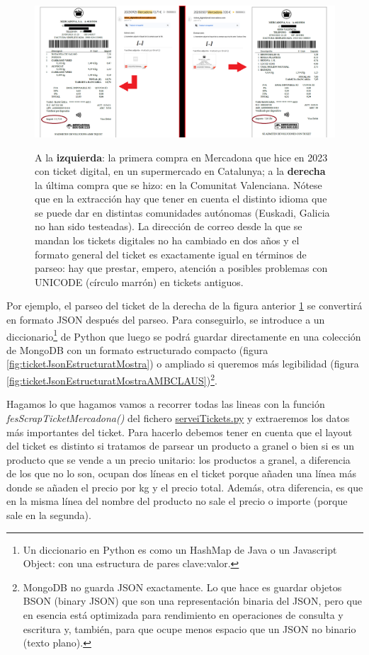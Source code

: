 \documentclass[a4paper,12pt]{report}
\begin{document}
		\FloatBarrier
		\setlength{\belowcaptionskip}{3pt}
		\begin{figure}[H]
			\centering
			\caption{A la \textbf{izquierda}: la primera compra en Mercadona que hice en 2023 con ticket digital, en un supermercado en Catalunya; a la \textbf{derecha} la última compra que se hizo: en la Comunitat Valenciana. Nótese que en la extracción hay que tener en cuenta el distinto idioma que se puede dar en distintas comunidades autónomas (Euskadi, Galicia no han sido testeadas). La dirección de correo desde la que se mandan los tickets digitales no ha cambiado en dos años y el formato general del ticket es exactamente igual en términos de parseo: hay que prestar, empero, atención a posibles problemas con UNICODE (círculo marrón) en tickets antiguos.}
			\includegraphics[width=1\linewidth]{img/primerIultimTiketMeuCorreu}
			\label{fig:primerIultimTiketMeuCorreu}
		\end{figure}
		\FloatBarrier
		
		Por ejemplo, el parseo del ticket de la derecha de la figura anterior \ref{fig:primerIultimTiketMeuCorreu} se convertirá en formato JSON después del parseo. Para conseguirlo, se introduce a un diccionario\footnote{Un diccionario en Python es como un HashMap de Java o un Javascript Object: con una estructura de pares clave:valor.} de Python que luego se podrá guardar directamente en una colección de MongoDB con un formato estructurado compacto (figura \ref{fig:ticketJsonEstructuratMostra}) o ampliado si queremos más legibilidad (figura \ref{fig:ticketJsonEstructuratMostraAMBCLAUS})\footnote{MongoDB no guarda JSON exactamente. Lo que hace es guardar objetos BSON (binary JSON) que son una representación binaria del JSON, pero que en esencia está optimizada para rendimiento en operaciones de consulta y escritura y, también, para que ocupe menos espacio que un JSON no binario (texto plano).}.
		
		Hagamos lo que hagamos vamos a recorrer todas las lineas con la función \textit{fesScrapTicketMercadona()} del fichero \href{https://github.com/blackcub3s/mercApp/blob/main/APP%20WEB/__FastAPI__/app/serveiTickets.py}{serveiTickets.py} y extraeremos los datos más importantes del ticket. Para hacerlo debemos tener en cuenta que el layout del ticket es distinto si tratamos de parsear un producto a granel o bien si es un producto que se vende a un precio unitario: los productos a granel, a diferencia de los que no lo son, ocupan dos líneas en el ticket porque añaden una línea más donde se añaden el precio por kg y el precio total. Además, otra diferencia, es que en la misma línea del nombre del producto no sale el precio o importe (porque sale en la segunda).
		
\end{document}

